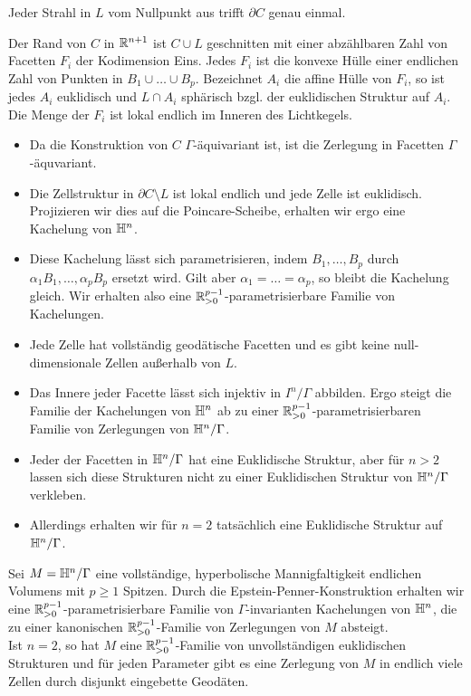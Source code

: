 \documentclass{book}
\begin{document}
\Lem{}
Jeder Strahl in $L$ vom Nullpunkt aus trifft $\partial C$ genau einmal.

\Prop{}
Der Rand von $C$ in $\mathbb{R}^{n+1}$ ist $C \cup L$ geschnitten mit einer abzählbaren Zahl von Facetten $F_i$ der Kodimension Eins. Jedes $F_i$ ist die konvexe Hülle einer endlichen Zahl von Punkten in $B_1\cup\ldots \cup B_p$. Bezeichnet $A_i$ die affine Hülle von $F_i$, so ist jedes $A_i$ euklidisch und $L\cap A_i$ sphärisch bzgl. der euklidischen Struktur auf $A_i$. Die Menge der $F_i$ ist lokal endlich im Inneren des Lichtkegels.

\Bem{}
\begin{itemize}
	\item Da die Konstruktion von $C$ $\Gamma$-äquivariant ist, ist die Zerlegung in Facetten $\Gamma$-äquvariant.
	\item Die Zellstruktur in $\partial C \setminus L$ ist lokal endlich und jede Zelle ist euklidisch. Projizieren wir dies auf die Poincare-Scheibe, erhalten wir ergo eine Kachelung von $\mathbb{H}^n$.
	\item Diese Kachelung lässt sich parametrisieren, indem $B_1,\ldots, B_p$ durch $\alpha_1B_1,\ldots, \alpha_p B_p$ ersetzt wird. Gilt aber $\alpha_1 = \ldots = \alpha_p$, so bleibt die Kachelung gleich. Wir erhalten also eine $\mathbb{R}_{> 0}^{p-1}$-parametrisierbare Familie von Kachelungen.
	\item Jede Zelle hat vollständig geodätische Facetten und es gibt keine null-dimensionale Zellen außerhalb von $L$.
	\item Das Innere jeder Facette lässt sich injektiv in $I^n / \Gamma$ abbilden. Ergo steigt die Familie der Kachelungen von $\mathbb{H}^n$ ab zu einer $\mathbb{R}_{> 0}^{p-1}$-parametrisierbaren Familie von Zerlegungen von $\mathbb{H}^n / \Gamma$.
	\item Jeder der Facetten in $\mathbb{H}^n / \Gamma$ hat eine Euklidische Struktur, aber für $n > 2$ lassen sich diese Strukturen nicht zu einer Euklidischen Struktur von $\mathbb{H}^n/\Gamma$ verkleben.
	\item Allerdings erhalten wir für $n = 2$ tatsächlich eine Euklidische Struktur auf $\mathbb{H}^n /\Gamma$.
\end{itemize}

\Satz{}
Sei $M = \mathbb{H}^n /\Gamma$ eine vollständige, hyperbolische Mannigfaltigkeit endlichen Volumens mit $p\geq 1$ Spitzen. Durch die Epstein-Penner-Konstruktion erhalten wir eine $\mathbb{R}_{>0}^{p-1}$-parametrisierbare Familie von $\Gamma$-invarianten Kachelungen von $\mathbb{H}^n$, die zu einer kanonischen $\mathbb{R}_{>0}^{p-1}$-Familie von Zerlegungen von $M$ absteigt.\\
Ist $n = 2$, so hat $M$ eine $\mathbb{R}_{>0}^{p-1}$-Familie von unvollständigen euklidischen Strukturen und für jeden Parameter gibt es eine Zerlegung von $M$ in endlich viele Zellen durch disjunkt eingebette Geodäten.
\end{document}
